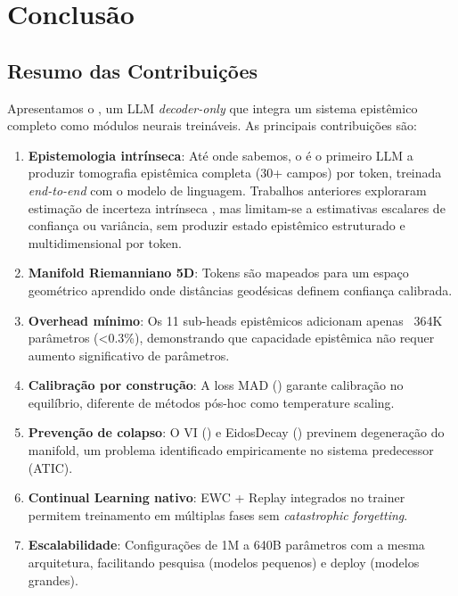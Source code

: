 
\section{Conclus\~ao}
\label{sec:conclusao}

\subsection{Resumo das Contribui\c{c}\~oes}

Apresentamos o \aletheion{}, um LLM \textit{decoder-only} que integra
um sistema epist\^emico completo como m\'odulos neurais trein\'aveis.
As principais contribui\c{c}\~oes s\~ao:

\begin{enumerate}
    \item \textbf{Epistemologia intr\'inseca}: At\'e onde sabemos, o
    \aletheion{} \'e o primeiro LLM a produzir tomografia epist\^emica
    completa (30+ campos) por token, treinada \textit{end-to-end} com o
    modelo de linguagem. Trabalhos anteriores exploraram estima\c{c}\~ao
    de incerteza intr\'inseca \cite{gal2016dropout, lakshminarayanan2017simple},
    mas limitam-se a estimativas escalares de confian\c{c}a ou vari\^ancia,
    sem produzir estado epist\^emico estruturado e multidimensional por token.

    \item \textbf{Manifold Riemanniano 5D}: Tokens s\~ao mapeados para
    um espa\c{c}o geom\'etrico aprendido onde dist\^ancias geod\'esicas
    definem confian\c{c}a calibrada.

    \item \textbf{Overhead m\'inimo}: Os 11 sub-heads epist\^emicos
    adicionam apenas ~364K par\^ametros (<0.3\%), demonstrando que
    capacidade epist\^emica n\~ao requer aumento significativo de
    par\^ametros.

    \item \textbf{Calibra\c{c}\~ao por constru\c{c}\~ao}: A loss MAD
    () garante calibra\c{c}\~ao no equil\'ibrio,
    diferente de m\'etodos p\'os-hoc como temperature scaling.

    \item \textbf{Preven\c{c}\~ao de colapso}: O VI ()
    e EidosDecay () previnem degenera\c{c}\~ao do
    manifold, um problema identificado empiricamente no sistema
    predecessor (ATIC).

    \item \textbf{Continual Learning nativo}: EWC + Replay integrados
    no trainer permitem treinamento em m\'ultiplas fases sem
    \textit{catastrophic forgetting}.

    \item \textbf{Escalabilidade}: Configura\c{c}\~oes de 1M a 640B
    par\^ametros com a mesma arquitetura, facilitando pesquisa
    (modelos pequenos) e deploy (modelos grandes).
\end{enumerate}

